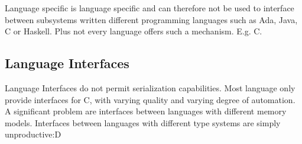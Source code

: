 Language specific is language specific and can therefore not be used to interface between subsystems written different programming languages such as Ada, Java, C or Haskell. Plus not every language offers such a mechanism. E.g. C.


\subsection*{Language Interfaces}
Language Interfaces do not permit serialization capabilities. Most language only provide interfaces for C, with varying quality and varying degree of automation. A significant problem are interfaces between languages with different memory models.
Interfaces between languages with different type systems are simply unproductive:D
